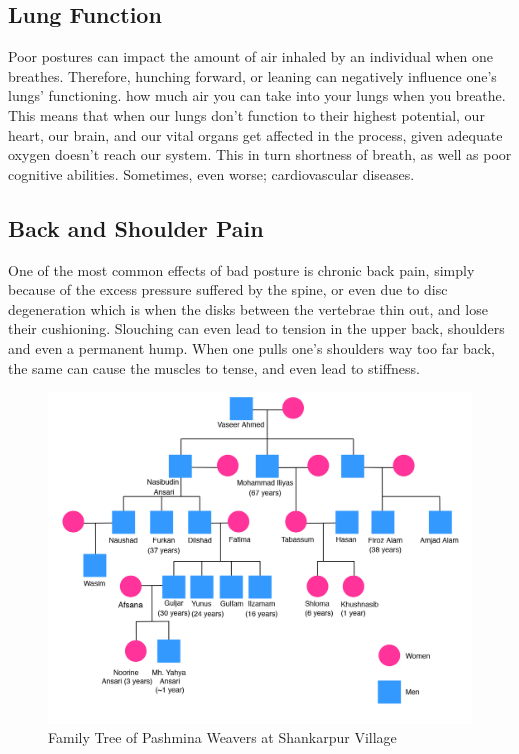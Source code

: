 \documentclass[journal]{IEEEtran}
\begin{document}
\subsection{Lung Function}
\par Poor postures can impact the amount of air inhaled by an individual when one breathes. Therefore, hunching forward, or leaning can negatively influence one’s lungs’ functioning.  how much air you can take into your lungs when you breathe. This means that when our lungs don’t function to their highest potential, our heart, our brain, and our vital organs get affected in the process, given adequate oxygen doesn’t reach our system. This in turn shortness of breath, as well as poor cognitive abilities. Sometimes, even worse; cardiovascular diseases.

\subsection{Back and Shoulder Pain}
\par One of the most common effects of bad posture is chronic back pain, simply because of the excess pressure suffered by the spine, or even due to disc degeneration which is when the disks between the vertebrae thin out, and lose their cushioning. Slouching can even lead to tension in the upper back, shoulders and even a permanent hump. When one pulls one’s shoulders way too far back, the same can cause the muscles to tense, and even lead to stiffness. 



\begin{figure}
  \includegraphics[width=\linewidth]{tree1.jpg}
  \caption{Family Tree of Pashmina Weavers at Shankarpur Village}
  \label{Family Tree Pashmina Cluster}
\end{figure}
\end{document}
